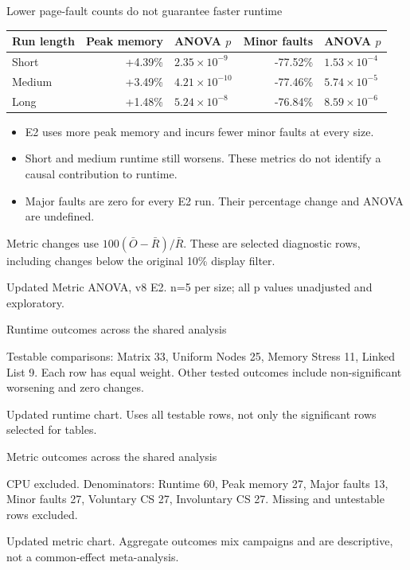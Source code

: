 \documentclass[aspectratio=169,11pt]{beamer}
\newcommand{\source}[1]{\par\vfill{\tiny\color{gray}#1\par}}
\newcommand{\plotheight}{4.3cm}
\begin{document}
\begin{frame}{Lower page-fault counts do not guarantee faster runtime}
\small\centering\begin{tabular}{lrlrl}\toprule
Run length & Peak memory & ANOVA $p$ & Minor faults & ANOVA $p$\\\midrule
Short & +4.39\% & $2.35\times10^{-9}$ & -77.52\% & $1.53\times10^{-4}$\\
Medium & +3.49\% & $4.21\times10^{-10}$ & -77.46\% & $5.74\times10^{-5}$\\
Long & +1.48\% & $5.24\times10^{-8}$ & -76.84\% & $8.59\times10^{-6}$\\
\bottomrule\end{tabular}\par
\medskip\raggedright\normalsize
\begin{itemize}\item E2 uses more peak memory and incurs fewer minor faults at every size.\item Short and medium runtime still worsens. These metrics do not identify a causal contribution to runtime.\item Major faults are zero for every E2 run. Their percentage change and ANOVA are undefined.\end{itemize}
\small Metric changes use $100(\bar O-\bar R)/\bar R$. These are selected diagnostic rows, including changes below the original 10\% display filter.
\source{Updated Metric ANOVA, v8 E2. n=5 per size; all p values unadjusted and exploratory.}
\end{frame}


\begin{frame}{Runtime outcomes across the shared analysis}
\centering\renewcommand{\plotheight}{4.1cm}
\par\scriptsize Testable comparisons: Matrix 33, Uniform Nodes 25, Memory Stress 11, Linked List 9. Each row has equal weight. Other tested outcomes include non-significant worsening and zero changes.
\source{Updated runtime chart. Uses all testable rows, not only the significant rows selected for tables.}
\end{frame}


\begin{frame}{Metric outcomes across the shared analysis}
\centering\renewcommand{\plotheight}{4.25cm}
\par\scriptsize CPU excluded. Denominators: Runtime 60, Peak memory 27, Major faults 13, Minor faults 27, Voluntary CS 27, Involuntary CS 27. Missing and untestable rows excluded.
\source{Updated metric chart. Aggregate outcomes mix campaigns and are descriptive, not a common-effect meta-analysis.}
\end{frame}
\end{document}
